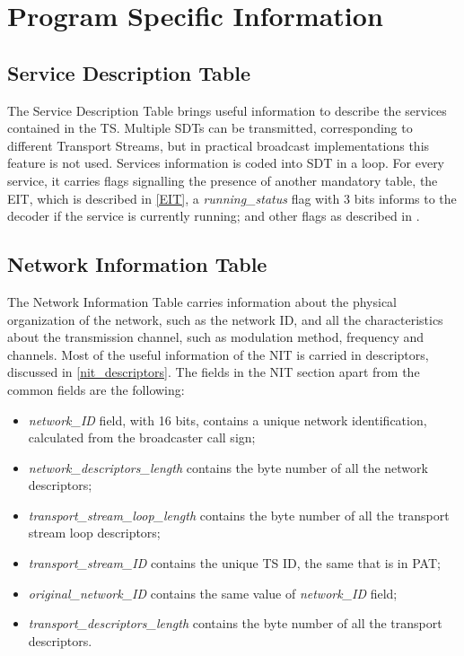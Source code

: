 \documentclass[
	12pt,				%
	openright,			%
	twoside,			%
	a4paper,			%
	brazil,
	french,				%
	english
	]{abntex2}
\begin{document}
\section{Program Specific Information} %
\label{abnt_psi}

\subsection{Service Description Table}
\label{SDT}
The Service Description Table brings useful information to describe the services contained in the TS. Multiple SDTs can be transmitted, corresponding to different Transport Streams, but in practical broadcast implementations this feature is not used. Services information is coded into SDT in a loop. For every service, it carries flags signalling the presence of another mandatory table, the EIT, which is described in \autoref{EIT}, a \textit{running\_status} flag with 3 bits informs to the decoder if the service is currently running; and other flags as described in .

\subsection{Network Information Table}
\label{NIT}
The Network Information Table carries information about the physical organization of the network, such as the network ID, and all the characteristics about the transmission channel, such as modulation method, frequency and channels. Most of the useful information of the NIT is carried in descriptors, discussed in \autoref{nit_descriptors}. The fields in the NIT section apart from the common fields are the following:
\begin{itemize}
\item{\textit{network\_ID} field, with 16 bits, contains a unique network identification, calculated from the broadcaster call sign;}
\item{\textit{network\_descriptors\_length} contains the byte number of all the network descriptors;}
\item{\textit{transport\_stream\_loop\_length} contains the byte number of all the transport stream loop descriptors;}
\item{\textit{transport\_stream\_ID} contains the unique TS ID, the same that is in PAT;}
\item{\textit{original\_network\_ID}  contains the same value of \textit{network\_ID} field;}
\item{\textit{transport\_descriptors\_length} contains the byte number of all the transport descriptors.}
\end{itemize}
\end{document}
